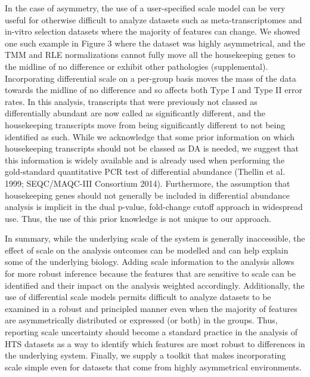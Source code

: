 \documentclass[
]{article}
\begin{document}
In the case of asymmetry, the use of a user-specified scale model can be
very useful for otherwise difficult to analyze datasets such as
meta-transcriptomes and in-vitro selection datasets where the majority
of features can change. We showed one such example in Figure 3 where the
dataset was highly asymmetrical, and the TMM and RLE normalizations
cannot fully move all the housekeeping genes to the midline of no
difference or exhibit other pathologies (supplemental). Incorporating
differential scale on a per-group basis moves the mass of the data
towards the midline of no difference and so affects both Type I and Type
II error rates. In this analysis, transcripts that were previously not
classed as differentially abundant are now called as significantly
different, and the housekeeping transcripts move from being
significantly different to not being identified as such. While we
acknowledge that some prior information on which housekeeping
transcripts should not be classed as DA is needed, we suggest that this
information is widely available and is already used when performing the
gold-standard quantitative PCR test of differential abundance (Thellin
et al. 1999; SEQC/MAQC-III Consortium 2014). Furthermore, the assumption
that housekeeping genes should not generally be included in differential
abundance analysis is implicit in the dual p-value, fold-change cutoff
approach in widespread use. Thus, the use of this prior knowledge is not
unique to our approach.

In summary, while the underlying scale of the system is generally
inaccessible, the effect of scale on the analysis outcomes can be
modelled and can help explain some of the underlying biology. Adding
scale information to the analysis allows for more robust inference
because the features that are sensitive to scale can be identified and
their impact on the analysis weighted accordingly. Additionally, the use
of differential scale models permits difficult to analyze datasets to be
examined in a robust and principled manner even when the majority of
features are asymmetrically distributed or expressed (or both) in the
groups. Thus, reporting scale uncertainty should become a standard
practice in the analysis of HTS datasets as a way to identify which
features are most robust to differences in the underlying system.
Finally, we supply a toolkit that makes incorporating scale simple even
for datasets that come from highly asymmetrical environments.
\end{document}
